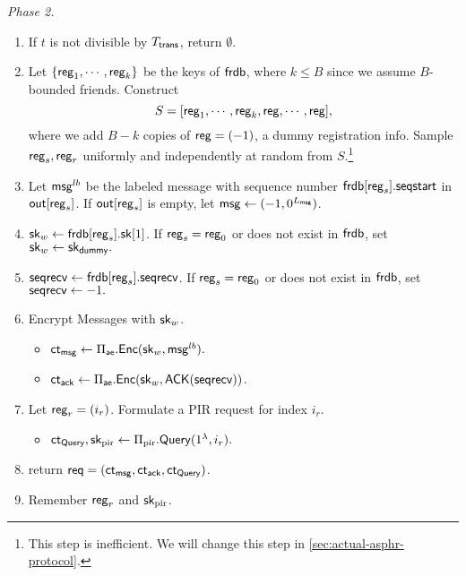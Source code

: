 \begin{definition}
\textit{Phase 2.}
\begin{enumerate}
    \item If $t$ is not divisible by $T_{\mathsf{trans}}$, return $\emptyset$.
    \item Let $\{\mathsf{reg}_1, \cdots, \mathsf{reg}_k\}$ be the keys of $\mathsf{frdb}$, where $k\leq B$ since we assume $B$-bounded friends. Construct 
    $$S = [\mathsf{reg}_1, \cdots, \mathsf{reg}_k, \mathsf{reg}, \cdots, \mathsf{reg}],$$ 
    where we add $B - k$ copies of $\mathsf{reg} = (-1)$, a dummy registration info. Sample $\mathsf{reg}_s, \mathsf{reg}_r$ uniformly and independently at random from $S$.\footnote{This step is inefficient. We will change this step in \cref{sec:actual-asphr-protocol}.}
    \item Let $\mathsf{msg}^{lb}$ be the labeled message with sequence number $\mathsf{frdb}[\mathsf{reg}_s].\mathsf{seqstart}$ in $\mathsf{out}[\mathsf{reg}_s]$. If $\mathsf{out}[\mathsf{reg}_s]$ is empty, let $\mathsf{msg} \leftarrow (-1, 0^{L_{\mathsf{msg}}})$.
    \item ${\mathsf{sk}}_w \leftarrow \mathsf{frdb}[\mathsf{reg}_s].{\mathsf{sk}}[1]$. If $\mathsf{reg}_s = \mathsf{reg}_0$ or does not exist in $\mathsf{frdb}$, set ${\mathsf{sk}}_w \leftarrow {\ensuremath{\mathsf{sk}}}_{\mathsf{dummy}}.$
    \item $\mathsf{seqrecv} \leftarrow \mathsf{frdb}[\mathsf{reg}_s].\mathsf{seqrecv}$. If $\mathsf{reg}_s = \mathsf{reg}_0$ or does not exist in $\mathsf{frdb}$, set $\mathsf{seqrecv} \leftarrow -1.$
    \item Encrypt Messages with ${\mathsf{sk}}_w$.
    \begin{itemize}
        \item $\mathsf{ct}_{\mathsf{msg}} \leftarrow \Pi_{\mathsf{ae}}.\mathsf{Enc}({\mathsf{sk}}_w, \mathsf{msg}^{lb}).$
        \item $\mathsf{ct}_{\mathsf{ack}} \leftarrow \Pi_{\mathsf{ae}}.\mathsf{Enc}({\mathsf{sk}}_w, \mathsf{ACK}(\mathsf{seqrecv}))$. 
    \end{itemize}
    \item Let $\mathsf{reg}_r = (i_r)$. Formulate a PIR request for index $i_r$. %
    \begin{itemize}
        \item $\mathsf{ct}_{\mathsf{Query}}, {\mathsf{sk}}_{\text{pir}} \leftarrow \Pi_{\text{pir}}.\mathsf{Query}(1^{\lambda}, i_r).$
    \end{itemize}
    \item return $\mathsf{req} = (\mathsf{ct}_{\mathsf{msg}}, \mathsf{ct}_{\mathsf{ack}}, \mathsf{ct}_{\mathsf{Query}})$.
    \item Remember $\mathsf{reg}_r$ and ${\mathsf{sk}}_{\text{pir}}$.
\end{enumerate}

\end{definition}
